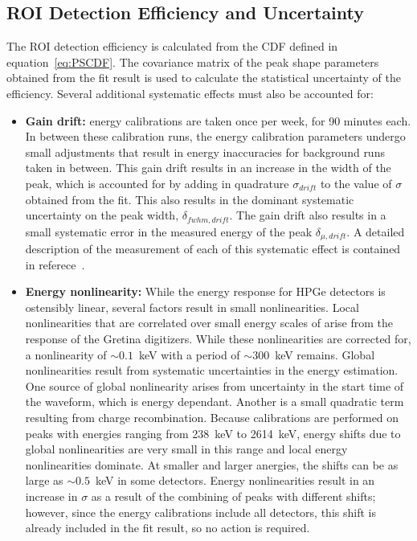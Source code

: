 \documentclass[/main.tex]{subfiles}
\begin{document}
\subsection{ROI Detection Efficiency and Uncertainty} \label{sec:ROIEff}
The ROI detection efficiency is calculated from the CDF defined in equation~\ref{eq:PSCDF}.
The covariance matrix of the peak shape parameters obtained from the fit result is used to calculate the statistical uncertainty of the efficiency.
Several additional systematic effects must also be accounted for:
\begin{itemize}
\item \textbf{Gain drift:}  energy calibrations are taken once per week, for 90 minutes each.
  In between these calibration runs, the energy calibration parameters undergo small adjustments that result in energy inaccuracies for background runs taken in between.
  This gain drift results in an increase in the width of the peak, which is accounted for by adding in quadrature $\sigma_{drift}$ to the value of $\sigma$ obtained from the fit.
  This also results in the dominant systematic uncertainty on the peak width, $\delta_{fwhm,drift}$.
  The gain drift also results in a small systematic error in the measured energy of the peak $\delta_{\mu,drift}$.
  A detailed description of the measurement of each of this systematic effect is contained in referece~\cite{energysystunidoc}.  
\item \textbf{Energy nonlinearity:} While the energy response for HPGe detectors is ostensibly linear, several factors result in small nonlinearities.
  Local nonlinearities that are correlated over small energy scales of arise from the response of the Gretina digitizers.
  While these nonlinearities are corrected for, a nonlinearity of $\sim0.1$~keV with a period of $\sim300$~keV remains.
  Global nonlinearities result from systematic uncertainties in the energy estimation.
  One source of global nonlinearity arises from uncertainty in the start time of the waveform, which is energy dependant.
  Another is a small quadratic term resulting from charge recombination.
  Because calibrations are performed on peaks with energies ranging from 238~keV to 2614~keV, energy shifts due to global nonlinearities are very small in this range and local energy nonlinearities dominate.
  At smaller and larger anergies, the shifts can be as large as $\sim0.5$~keV in some detectors.
  Energy nonlinearities result in an increase in $\sigma$ as a result of the combining of peaks with different shifts; however, since the energy calibrations include all detectors, this shift is already included in the fit result, so no action is required.

\end{itemize}
\end{document}
